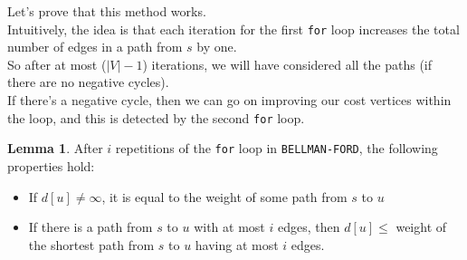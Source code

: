 \documentclass[12pt]{article}
\theoremstyle{plain}
\theoremstyle{definition}
\newtheorem{lemma}[theorem]{Lemma}
\begin{document}
Let's prove that this method works. \\
Intuitively, the idea is that each iteration for the first \texttt{for} loop increases the total number of edges in a path from $s$ by one. \\
So after at most ($|V| - 1$) iterations, we will have considered all the paths (if there are no negative cycles). \\
If there's a negative cycle, then we can go on improving our cost vertices within the loop, and this is detected by the second \texttt{for} loop.

\begin{lemma}
After $i$ repetitions of the \texttt{for} loop in \texttt{BELLMAN-FORD}, the following properties hold:
\begin{itemize}
  \item If $d[u] \neq \infty$, it is equal to the weight of some path from $s$ to $u$
  \item If there is a path from $s$ to $u$ with at most $i$ edges, then $d[u] \leq$ weight of the shortest path from $s$ to $u$ having at most $i$ edges.
\end{itemize}
\end{lemma}
\end{document}
